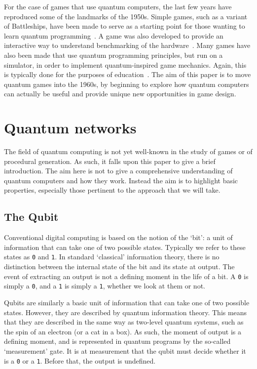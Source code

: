 \documentclass[conference]{IEEEtran}
\begin{document}
For the case of games that use quantum computers, the last few years have reproduced some of the landmarks of the 1950s. Simple games, such as a variant of Battleships, have been made to serve as a starting point for those wanting to learn quantum programming~\cite{wootton:battleships}. A game was also developed to provide an interactive way to understand benchmarking of the hardware~\cite{wootton:awesomeness}. Many games have also been made that use quantum programming principles, but run on a simulator, in order to implement quantum-inspired game mechanics. Again, this is typically done for the purposes of education~\cite{wootton:history}. The aim of this paper is to move quantum games into the 1960s, by beginning to explore how quantum computers can actually be useful and provide unique new opportunities in game design.

\section{Quantum networks}

The field of quantum computing is not yet well-known in the study of games or of procedural generation. As such, it falls upon this paper to give a brief introduction. The aim here is not to give a comprehensive understanding of quantum computers and how they work. Instead the aim is to highlight basic properties, especially those pertinent to the approach that we will take.


\subsection{The Qubit}

Conventional digital computing is based on the notion of the `bit': a unit of information that can take one of two possible states. Typically we refer to these states as \texttt{0} and \texttt{1}. In standard `classical' information theory, there is no distinction between the internal state of the bit and its state at output. The event of extracting an output is not a defining moment in the life of a bit. A \texttt{0} is simply a \texttt{0}, and a \texttt{1} is simply a \texttt{1}, whether we look at them or not.

Qubits are similarly a basic unit of information that can take one of two possible states. However, they are described by quantum information theory. This means that they are described in the same way as two-level quantum systems, such as the spin of an electron (or a cat in a box). As such, the moment of output is a defining moment, and is represented in quantum programs by the so-called `measurement' gate. It is at measurement that the qubit must decide whether it is a \texttt{0} or a \texttt{1}. Before that, the output is undefined.
\end{document}
